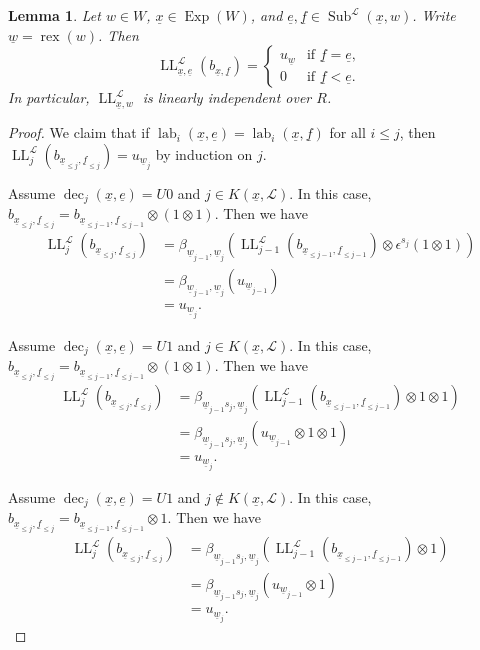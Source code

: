 \documentclass{amsart}
\newcommand{\scrL}{\mathcal{L}}
\DeclareMathOperator{\rex}{rex}
\DeclareMathOperator{\LL}{LL}
\DeclareMathOperator{\lab}{lab}
\DeclareMathOperator{\dec}{dec}
\DeclareMathOperator{\Exp}{Exp}
\DeclareMathOperator{\Subexp}{Sub}
\newcommand{\ue}{\underline{e}}
\newcommand{\uf}{\underline{f}}
\newcommand{\uw}{\underline{w}}
\newcommand{\ux}{\underline{x}}
\newtheorem{lemma}[subsubsection]{Lemma}
\theoremstyle{definition}
\numberwithin{equation}{subsection}
\begin{document}
\begin{lemma}\label{lem:ll_are_lin_indep}
    Let $w \in W$, $\ux \in \Exp (W)$, and $\ue, \uf \in \Subexp^{\scrL} (\ux, w)$. Write $\uw = \rex (w)$.
    Then
    \[\LL_{\ux, \ue}^{\scrL} (b_{\ux, \uf}) = \begin{cases} u_{\uw} & \text{if } \uf = \ue, \\ 0 & \text{if } \uf < \ue. \end{cases}\]
    In particular, $\LL_{\ux, w}^{\scrL}$ is linearly independent over $R$.
\end{lemma}
\begin{proof}
    We claim that if $\lab_i (\ux, \ue) = \lab_i (\ux,\uf)$ for all $i \leq j$, then $\LL_j^{\scrL} (b_{\ux_{\leq j}, \uf_{\leq j}}) = u_{\uw_j}$ by induction on $j$.

    Assume $\dec_j (\ux, \ue) = U0$ and $j \in K(\ux, \scrL)$. In this case, $b_{\ux_{\leq j}, \uf_{\leq j}} = b_{\ux_{\leq j-1}, \uf_{\leq j-1}} \otimes (1 \otimes 1)$.
    Then we have
    \begin{align*}
        \LL_j^{\scrL} (b_{\ux_{\leq j}, \uf_{\leq j}}) &= \beta_{\uw_{j-1}, \uw_j} \left(\LL_{j-1}^{\scrL} (b_{\ux_{\leq j-1}, \uf_{\leq j-1}}) \otimes \epsilon^{s_j} (1 \otimes 1) \right) \\
        &= \beta_{\uw_{j-1}, \uw_j} (u_{\uw_{j-1}}) \\
        &= u_{\uw_j}.
    \end{align*}

    Assume $\dec_j (\ux, \ue) = U1$ and $j \in K(\ux, \scrL)$. In this case, $b_{\ux_{\leq j}, \uf_{\leq j}} = b_{\ux_{\leq j-1}, \uf_{\leq j-1}} \otimes (1 \otimes 1)$.
    Then we have
    \begin{align*}
        \LL_j^{\scrL} (b_{\ux_{\leq j}, \uf_{\leq j}}) &= \beta_{\uw_{j-1}s_j, \uw_j} \left(\LL_{j-1}^{\scrL} (b_{\ux_{\leq j-1}, \uf_{\leq j-1}}) \otimes 1 \otimes 1 \right) \\
        &= \beta_{\uw_{j-1}s_j, \uw_j} (u_{\uw_{j-1}} \otimes 1 \otimes 1) \\
        &= u_{\uw_j}.
    \end{align*}

    Assume $\dec_j (\ux, \ue) = U1$ and $j \notin K(\ux, \scrL)$. In this case, $b_{\ux_{\leq j}, \uf_{\leq j}} = b_{\ux_{\leq j-1}, \uf_{\leq j-1}} \otimes 1$.
    Then we have
    \begin{align*}
        \LL_j^{\scrL} (b_{\ux_{\leq j}, \uf_{\leq j}}) &= \beta_{\uw_{j-1}s_j, \uw_j} \left(\LL_{j-1}^{\scrL} (b_{\ux_{\leq j-1}, \uf_{\leq j-1}}) \otimes 1 \right) \\
        &= \beta_{\uw_{j-1}s_j, \uw_j} (u_{\uw_{j-1}} \otimes 1 ) \\
        &= u_{\uw_j}.
    \end{align*}


\end{proof}
\end{document}
